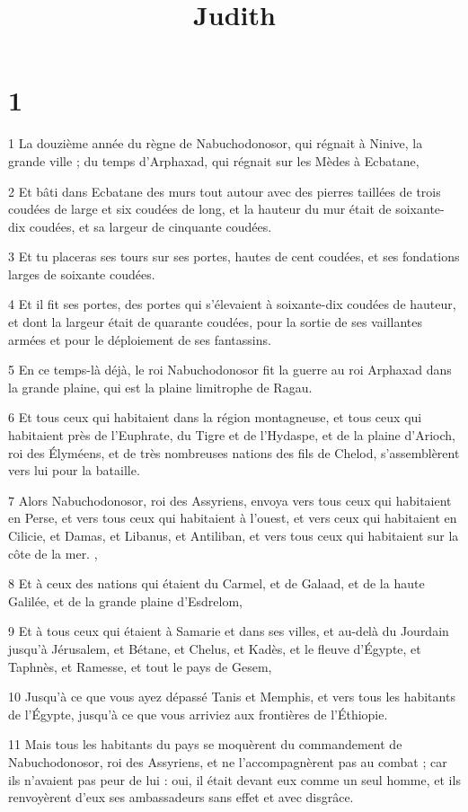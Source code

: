 

\title{Judith}


\chapter{1}

\par 1 La douzième année du règne de Nabuchodonosor, qui régnait à Ninive, la grande ville ; du temps d'Arphaxad, qui régnait sur les Mèdes à Ecbatane,
\par 2 Et bâti dans Ecbatane des murs tout autour avec des pierres taillées de trois coudées de large et six coudées de long, et la hauteur du mur était de soixante-dix coudées, et sa largeur de cinquante coudées.
\par 3 Et tu placeras ses tours sur ses portes, hautes de cent coudées, et ses fondations larges de soixante coudées.
\par 4 Et il fit ses portes, des portes qui s'élevaient à soixante-dix coudées de hauteur, et dont la largeur était de quarante coudées, pour la sortie de ses vaillantes armées et pour le déploiement de ses fantassins.
\par 5 En ce temps-là déjà, le roi Nabuchodonosor fit la guerre au roi Arphaxad dans la grande plaine, qui est la plaine limitrophe de Ragau.
\par 6 Et tous ceux qui habitaient dans la région montagneuse, et tous ceux qui habitaient près de l'Euphrate, du Tigre et de l'Hydaspe, et de la plaine d'Arioch, roi des Élyméens, et de très nombreuses nations des fils de Chelod, s'assemblèrent vers lui pour la bataille.
\par 7 Alors Nabuchodonosor, roi des Assyriens, envoya vers tous ceux qui habitaient en Perse, et vers tous ceux qui habitaient à l'ouest, et vers ceux qui habitaient en Cilicie, et Damas, et Libanus, et Antiliban, et vers tous ceux qui habitaient sur la côte de la mer. ,
\par 8 Et à ceux des nations qui étaient du Carmel, et de Galaad, et de la haute Galilée, et de la grande plaine d'Esdrelom,
\par 9 Et à tous ceux qui étaient à Samarie et dans ses villes, et au-delà du Jourdain jusqu'à Jérusalem, et Bétane, et Chelus, et Kadès, et le fleuve d'Égypte, et Taphnès, et Ramesse, et tout le pays de Gesem,
\par 10 Jusqu'à ce que vous ayez dépassé Tanis et Memphis, et vers tous les habitants de l'Égypte, jusqu'à ce que vous arriviez aux frontières de l'Éthiopie.
\par 11 Mais tous les habitants du pays se moquèrent du commandement de Nabuchodonosor, roi des Assyriens, et ne l'accompagnèrent pas au combat ; car ils n'avaient pas peur de lui : oui, il était devant eux comme un seul homme, et ils renvoyèrent d'eux ses ambassadeurs sans effet et avec disgrâce.
